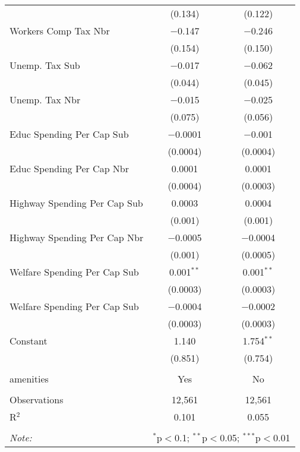 \begin{table}[!htbp]
\begin{tabular}{@{\extracolsep{5pt}}lcc}
  & (0.134) & (0.122) \\ 
  Workers Comp Tax Nbr & $-$0.147 & $-$0.246 \\ 
  & (0.154) & (0.150) \\ 
  Unemp. Tax Sub & $-$0.017 & $-$0.062 \\ 
  & (0.044) & (0.045) \\ 
  Unemp. Tax Nbr & $-$0.015 & $-$0.025 \\ 
  & (0.075) & (0.056) \\ 
  Educ Spending Per Cap Sub & $-$0.0001 & $-$0.001 \\ 
  & (0.0004) & (0.0004) \\ 
  Educ Spending Per Cap Nbr & 0.0001 & 0.0001 \\ 
  & (0.0004) & (0.0003) \\ 
  Highway Spending Per Cap Sub & 0.0003 & 0.0004 \\ 
  & (0.001) & (0.001) \\ 
  Highway Spending Per Cap Nbr & $-$0.0005 & $-$0.0004 \\ 
  & (0.001) & (0.0005) \\ 
  Welfare Spending Per Cap Sub & 0.001$^{**}$ & 0.001$^{**}$ \\ 
  & (0.0003) & (0.0003) \\ 
  Welfare Spending Per Cap Sub & $-$0.0004 & $-$0.0002 \\ 
  & (0.0003) & (0.0003) \\ 
  Constant & 1.140 & 1.754$^{**}$ \\ 
  & (0.851) & (0.754) \\ 
 \hline \\[-1.8ex] 
amenities & Yes & No \\ 
\hline \\[-1.8ex] 
Observations & 12,561 & 12,561 \\ 
R$^{2}$ & 0.101 & 0.055 \\ 
\hline 
\hline \\[-1.8ex] 
\textit{Note:}  & \multicolumn{2}{r}{$^{*}$p$<$0.1; $^{**}$p$<$0.05; $^{***}$p$<$0.01} \\ 
\end{tabular} 
\end{table} 

